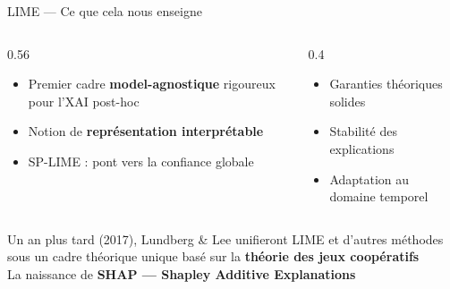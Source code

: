 \documentclass[10pt]{beamer}
\begin{document}
\begin{frame}{LIME --- Ce que cela nous enseigne}
  \begin{columns}
    \begin{column}{0.56\textwidth}
      \begin{tcolorbox}[
        colback=green!3, colframe=green!40!black,
        arc=2mm, boxrule=0.5pt, fonttitle=\bfseries,
        title={Apports fondamentaux}]
        \begin{itemize}
          \item Premier cadre \textbf{model-agnostique} rigoureux pour l'XAI post-hoc
          \item Notion de \textbf{représentation interprétable}
          \item SP-LIME : pont vers la confiance globale
        \end{itemize}
      \end{tcolorbox}
    \end{column}
    \begin{column}{0.4\textwidth}
      \begin{tcolorbox}[
        colback=red!3, colframe=red!60!black,
        arc=2mm, boxrule=0.5pt, fonttitle=\bfseries,
        title={Ce qui manque}]
        \begin{itemize}
          \item Garanties théoriques solides
          \item Stabilité des explications
          \item Adaptation au domaine temporel
        \end{itemize}
      \end{tcolorbox}
    \end{column}
  \end{columns}

  \vspace{6pt}
  \begin{tcolorbox}[colback=blue!3, colframe=blue!40!black, arc=2mm, boxrule=0.5pt]
    \centering
    Un an plus tard (2017), Lundberg \& Lee unifieront LIME et d'autres méthodes
    sous un cadre théorique unique basé sur la \textbf{théorie des jeux coopératifs}\\[4pt]
    La naissance de \textbf{SHAP --- Shapley Additive Explanations}
  \end{tcolorbox}
\end{frame}
\end{document}
